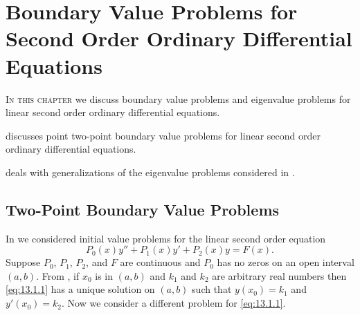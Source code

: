 
\chapter[running={Boundary Value Problems for 2nd Order ODEs}]{Boundary Value Problems for Second Order Ordinary Differential Equations}
\label{ch:bvp_second_order}

\textsc{In this chapter} we discuss  boundary value problems and eigenvalue
problems for linear second order ordinary differential equations.

\medskip\noindent
{} discusses point two-point boundary value
problems for linear second order ordinary differential equations.


\medskip\noindent
{} deals with generalizations of the eigenvalue
problems considered in .

\newpage


\section{Two-Point Boundary Value Problems}\label{sec:twopoint_bvp}

In  we considered initial value problems for the
linear second order equation
\begin{equation} \label{eq:13.1.1}
P_{0}(x)y''+P_{1}(x)y'+P_{2}(x)y=F(x).
\end{equation}
Suppose $P_{0}$, $P_{1}$, $P_{2}$, and $F$ are continuous and $P_{0}$
has no zeros on an open interval
$(a,b)$.
From , if $x_{0}$ is in
$(a,b)$ and  $k_{1}$ and $k_{2}$ are arbitrary real numbers then
\eqref{eq:13.1.1} has a unique solution on $(a,b)$ such that $y(x_{0})=k_{1}$
and $y'(x_{0})=k_{2}$. Now we consider a different problem for
\eqref{eq:13.1.1}.

